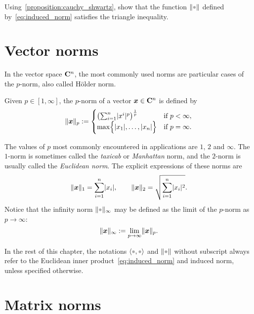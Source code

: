 \begin{exercise}
    Using~\cref{proposition:cauchy_shwartz},
    show that the function $\norm{\placeholder}$ defined by~\eqref{eq:induced_norm} satisfies the triangle inequality.
\end{exercise}

\section{Vector norms}%
\label{sub:vector_norms}

In the vector space $\mathbf C^n$,
the most commonly used norms are particular cases of the $p$-norm, also called H\"older norm.

\begin{definition}
    \label{definition:pnorm_vector}
    Given $p \in [1, \infty]$,
    the $p$-norm of a vector $\mathbf{\boldsymbol{x}} \in \mathbf C^n$ is defined by
    \[
        \lVert\mathbf{\boldsymbol{x}}\rVert_p :=
        \begin{cases}
            \left( \sum_{i=1}^{n} \lvert x^i\rvert^p \right)^{\frac{1}{p}} & \text{if $p < \infty$}, \\
            \max \Bigl\{ \lvert x_1\rvert, \dotsc, \lvert x_n\rvert \Bigr\} & \text{if $p = \infty$}.
        \end{cases}
    \]
\end{definition}
The values of $p$ most commonly encountered in applications are $1$, $2$ and $\infty$.
The $1$-norm is sometimes called the \emph{taxicab} or \emph{Manhattan} norm,
and the $2$-norm is usually called the \emph{Euclidean norm}.
The explicit expressions of these norms are
\[
    \lVert\mathbf{\boldsymbol{x}}\rVert_1 = \sum_{i=1}^{n} \lvert x_i\rvert,
    \qquad
    \lVert\mathbf{\boldsymbol{x}}\rVert_2 = \sqrt{\sum_{i=1}^{n} \lvert x_i\rvert^2}.
\]
Notice that the infinity norm $\norm{\placeholder}_{\infty}$ may be defined as the limit of the $p$-norm as $p \to \infty$:
\[
    \lVert\mathbf{\boldsymbol{x}}\rVert_{\infty}
    := \lim_{p \to \infty} \lVert\mathbf{\boldsymbol{x}}\rVert_p.
\]

In the rest of this chapter,
the notations $\ip{\placeholder,\placeholder}$ and $\norm{\placeholder}$ without subscript always refer to the Euclidean inner product~\eqref{eq:induced_norm} and induced norm,
unless specified otherwise.

\section{Matrix norms}%
\label{sec:matrix_norms}

